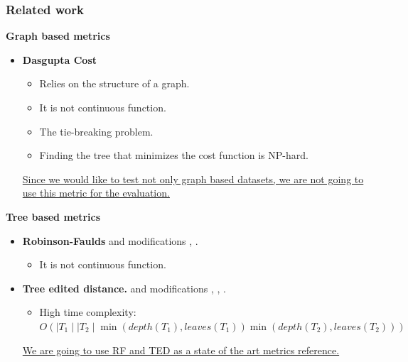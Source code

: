 \documentclass{tum-presentation}
\begin{document}
\begin{frame}
	\frametitle{Related work}
	
	\textbf{\textcolor{TUMBlauDunkel}{Graph based metrics}}
	\begin{itemize}
		\item \textbf{\textcolor{TUMBlau}{Dasgupta Cost}} \cite{dasgupta2016cost}
		\begin{itemize}
			\item Relies on the structure of a graph.
			\item It is not continuous function.
			\item The tie-breaking problem.
			\item Finding the tree that minimizes the cost function is NP-hard.
		\end{itemize}
	
	\vspace{0.3cm}
	
	\underline{Since we would like to test not only graph based datasets, we are not going to use this metric for the evaluation.}
	\end{itemize}
	
	\pause  
	
	\vspace{0.3cm}
	
	\textbf{\textcolor{TUMBlauDunkel}{Tree based metrics}}
	\begin{itemize}
	\item \textbf{\textcolor{TUMBlau}{Robinson-Faulds}} \cite{ROBINSON} and modifications \cite{Kuhner1994}, \cite{Critchlow1996}. 
		\begin{itemize}
			\item It is not continuous function.
		\end{itemize}
	\item \textbf{\textcolor{TUMBlau}{Tree edited distance.}} \cite{Zhang1989} and modifications \cite{Tai1979}, \cite{Pawlik2011}, \cite{Pawlik2017}. 
		\begin{itemize}
			\item High time complexity: $O(\mid T_1 \mid \mid T_2 \mid  \min(depth(T_1),leaves(T_1))  \min(depth(T_2),leaves(T_2)))$
		\end{itemize}
	
	\vspace{0.3cm}
	
	\underline{	We are going to use RF and TED as a state of the art metrics reference. }
	\end{itemize}
	

\end{frame}
\end{document}
